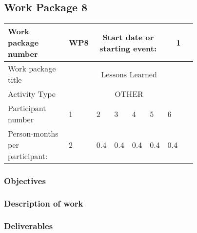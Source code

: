 \subsection{Work Package 8}

\begin{table}[hbpt]\centering
	\begin{tabular}{|p{0.35\linewidth}|p{0.06\linewidth}|p{0.06\linewidth}|p{0.06\linewidth}|
         p{0.06\linewidth}|p{0.06\linewidth}|p{0.06\linewidth}|p{0.06\linewidth}|}\hline
		 Work package number& WP8 &
		 \multicolumn{4}{|c|}{Start date or starting event:}{}&
		 \multicolumn{2}{|c|}{                        1 }{}\\\hline
		 Work package title&\multicolumn{7}{|c|}{ Lessons Learned }{}\\\hline
		 Activity Type&\multicolumn{7}{|c|}{    OTHER}{}\\\hline
		 Participant number & 1 & 2 & 3 & 4 & 5 & 6 & ~ \\\hline
		 Person-months per participant: & 2 & 0.4 & 0.4 & 0.4 & 0.4 & 0.4 & ~ \\\hline
	\end{tabular}
\end{table}

\subsubsection{Objectives}

\subsubsection{Description of work}

\subsubsection{Deliverables}